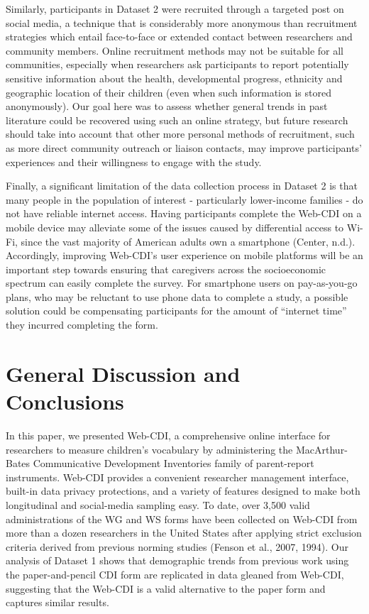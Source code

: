\documentclass[
  english,
  ,man,floatsintext]{apa6}
\begin{document}
Similarly, participants in Dataset 2 were recruited through a targeted post on social media, a technique that is considerably more anonymous than recruitment strategies which entail face-to-face or extended contact between researchers and community members. Online recruitment methods may not be suitable for all communities, especially when researchers ask participants to report potentially sensitive information about the health, developmental progress, ethnicity and geographic location of their children (even when such information is stored anonymously). Our goal here was to assess whether general trends in past literature could be recovered using such an online strategy, but future research should take into account that other more personal methods of recruitment, such as more direct community outreach or liaison contacts, may improve participants' experiences and their willingness to engage with the study.

Finally, a significant limitation of the data collection process in Dataset 2 is that many people in the population of interest - particularly lower-income families - do not have reliable internet access. Having participants complete the Web-CDI on a mobile device may alleviate some of the issues caused by differential access to Wi-Fi, since the vast majority of American adults own a smartphone (Center, n.d.). Accordingly, improving Web-CDI's user experience on mobile platforms will be an important step towards ensuring that caregivers across the socioeconomic spectrum can easily complete the survey. For smartphone users on pay-as-you-go plans, who may be reluctant to use phone data to complete a study, a possible solution could be compensating participants for the amount of \enquote{internet time} they incurred completing the form.

\hypertarget{general-discussion-and-conclusions}{%
\section{General Discussion and Conclusions}\label{general-discussion-and-conclusions}}

In this paper, we presented Web-CDI, a comprehensive online interface for researchers to measure children's vocabulary by administering the MacArthur-Bates Communicative Development Inventories family of parent-report instruments. Web-CDI provides a convenient researcher management interface, built-in data privacy protections, and a variety of features designed to make both longitudinal and social-media sampling easy. To date, over 3,500 valid administrations of the WG and WS forms have been collected on Web-CDI from more than a dozen researchers in the United States after applying strict exclusion criteria derived from previous norming studies (Fenson et al., 2007, 1994). Our analysis of Dataset 1 shows that demographic trends from previous work using the paper-and-pencil CDI form are replicated in data gleaned from Web-CDI, suggesting that the Web-CDI is a valid alternative to the paper form and captures similar results.
\end{document}
